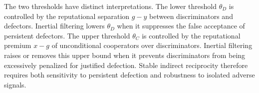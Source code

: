 \documentclass[fleqn,10pt]{wlscirep}
\begin{document}
The two thresholds have distinct interpretations. The lower threshold $\theta_D$ is controlled by the reputational separation $g-y$ between discriminators and defectors. Inertial filtering lowers $\theta_D$ when it suppresses the false acceptance of persistent defectors. The upper threshold $\theta_C$ is controlled by the reputational premium $x-g$ of unconditional cooperators over discriminators. Inertial filtering raises or removes this upper bound when it prevents discriminators from being excessively penalized for justified defection. Stable indirect reciprocity therefore requires both sensitivity to persistent defection and robustness to isolated adverse signals.






\newpage

% 
\end{document}
